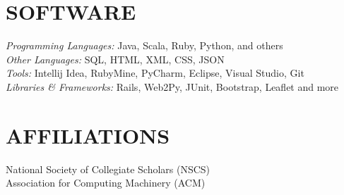 \documentclass[margin]{res}
\begin{document}
\begin{resume}
\section{SOFTWARE} 
  {\sl Programming Languages:} Java, Scala, Ruby, Python, and others \\
  {\sl Other Languages:} SQL, HTML, XML, CSS, JSON \\ 
  {\sl Tools:} Intellij Idea, RubyMine, PyCharm, Eclipse, Visual Studio, Git \\
  {\sl Libraries \& Frameworks:} Rails, Web2Py, JUnit, Bootstrap, Leaflet and more 
 
\section{AFFILIATIONS}             
  National Society of Collegiate Scholars (NSCS) \\
  Association for Computing Machinery (ACM)
            
\end{resume}
\end{document}
